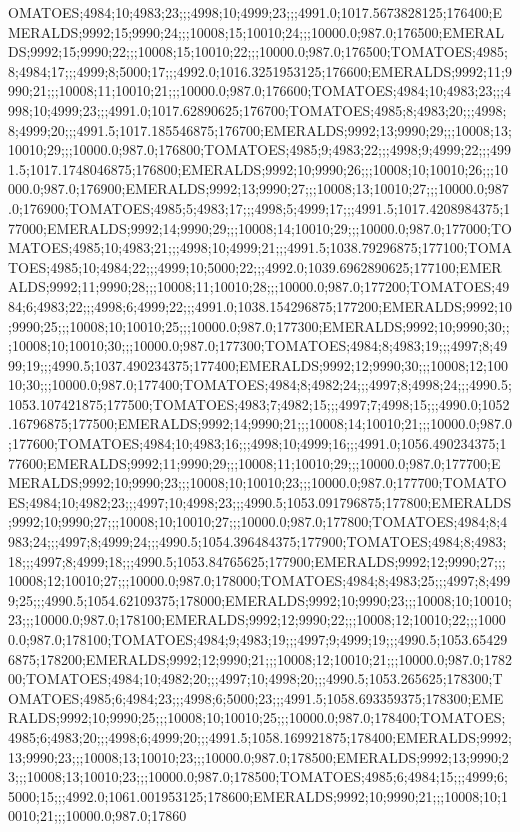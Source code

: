 OMATOES;4984;10;4983;23;;;4998;10;4999;23;;;4991.0;1017.5673828125;176400;EMERALDS;9992;15;9990;24;;;10008;15;10010;24;;;10000.0;987.0;176500;EMERALDS;9992;15;9990;22;;;10008;15;10010;22;;;10000.0;987.0;176500;TOMATOES;4985;8;4984;17;;;4999;8;5000;17;;;4992.0;1016.3251953125;176600;EMERALDS;9992;11;9990;21;;;10008;11;10010;21;;;10000.0;987.0;176600;TOMATOES;4984;10;4983;23;;;4998;10;4999;23;;;4991.0;1017.62890625;176700;TOMATOES;4985;8;4983;20;;;4998;8;4999;20;;;4991.5;1017.185546875;176700;EMERALDS;9992;13;9990;29;;;10008;13;10010;29;;;10000.0;987.0;176800;TOMATOES;4985;9;4983;22;;;4998;9;4999;22;;;4991.5;1017.1748046875;176800;EMERALDS;9992;10;9990;26;;;10008;10;10010;26;;;10000.0;987.0;176900;EMERALDS;9992;13;9990;27;;;10008;13;10010;27;;;10000.0;987.0;176900;TOMATOES;4985;5;4983;17;;;4998;5;4999;17;;;4991.5;1017.4208984375;177000;EMERALDS;9992;14;9990;29;;;10008;14;10010;29;;;10000.0;987.0;177000;TOMATOES;4985;10;4983;21;;;4998;10;4999;21;;;4991.5;1038.79296875;177100;TOMATOES;4985;10;4984;22;;;4999;10;5000;22;;;4992.0;1039.6962890625;177100;EMERALDS;9992;11;9990;28;;;10008;11;10010;28;;;10000.0;987.0;177200;TOMATOES;4984;6;4983;22;;;4998;6;4999;22;;;4991.0;1038.154296875;177200;EMERALDS;9992;10;9990;25;;;10008;10;10010;25;;;10000.0;987.0;177300;EMERALDS;9992;10;9990;30;;;10008;10;10010;30;;;10000.0;987.0;177300;TOMATOES;4984;8;4983;19;;;4997;8;4999;19;;;4990.5;1037.490234375;177400;EMERALDS;9992;12;9990;30;;;10008;12;10010;30;;;10000.0;987.0;177400;TOMATOES;4984;8;4982;24;;;4997;8;4998;24;;;4990.5;1053.107421875;177500;TOMATOES;4983;7;4982;15;;;4997;7;4998;15;;;4990.0;1052.16796875;177500;EMERALDS;9992;14;9990;21;;;10008;14;10010;21;;;10000.0;987.0;177600;TOMATOES;4984;10;4983;16;;;4998;10;4999;16;;;4991.0;1056.490234375;177600;EMERALDS;9992;11;9990;29;;;10008;11;10010;29;;;10000.0;987.0;177700;EMERALDS;9992;10;9990;23;;;10008;10;10010;23;;;10000.0;987.0;177700;TOMATOES;4984;10;4982;23;;;4997;10;4998;23;;;4990.5;1053.091796875;177800;EMERALDS;9992;10;9990;27;;;10008;10;10010;27;;;10000.0;987.0;177800;TOMATOES;4984;8;4983;24;;;4997;8;4999;24;;;4990.5;1054.396484375;177900;TOMATOES;4984;8;4983;18;;;4997;8;4999;18;;;4990.5;1053.84765625;177900;EMERALDS;9992;12;9990;27;;;10008;12;10010;27;;;10000.0;987.0;178000;TOMATOES;4984;8;4983;25;;;4997;8;4999;25;;;4990.5;1054.62109375;178000;EMERALDS;9992;10;9990;23;;;10008;10;10010;23;;;10000.0;987.0;178100;EMERALDS;9992;12;9990;22;;;10008;12;10010;22;;;10000.0;987.0;178100;TOMATOES;4984;9;4983;19;;;4997;9;4999;19;;;4990.5;1053.654296875;178200;EMERALDS;9992;12;9990;21;;;10008;12;10010;21;;;10000.0;987.0;178200;TOMATOES;4984;10;4982;20;;;4997;10;4998;20;;;4990.5;1053.265625;178300;TOMATOES;4985;6;4984;23;;;4998;6;5000;23;;;4991.5;1058.693359375;178300;EMERALDS;9992;10;9990;25;;;10008;10;10010;25;;;10000.0;987.0;178400;TOMATOES;4985;6;4983;20;;;4998;6;4999;20;;;4991.5;1058.169921875;178400;EMERALDS;9992;13;9990;23;;;10008;13;10010;23;;;10000.0;987.0;178500;EMERALDS;9992;13;9990;23;;;10008;13;10010;23;;;10000.0;987.0;178500;TOMATOES;4985;6;4984;15;;;4999;6;5000;15;;;4992.0;1061.001953125;178600;EMERALDS;9992;10;9990;21;;;10008;10;10010;21;;;10000.0;987.0;17860